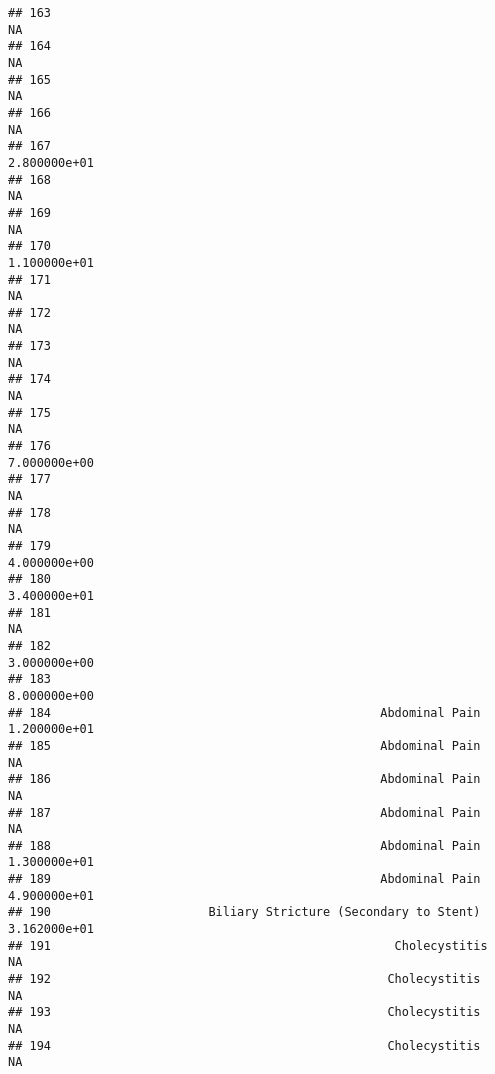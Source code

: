 \documentclass[
]{article}
\begin{document}
\begin{verbatim}
## 163                                                                         NA
## 164                                                                         NA
## 165                                                                         NA
## 166                                                                         NA
## 167                                                               2.800000e+01
## 168                                                                         NA
## 169                                                                         NA
## 170                                                               1.100000e+01
## 171                                                                         NA
## 172                                                                         NA
## 173                                                                         NA
## 174                                                                         NA
## 175                                                                         NA
## 176                                                               7.000000e+00
## 177                                                                         NA
## 178                                                                         NA
## 179                                                               4.000000e+00
## 180                                                               3.400000e+01
## 181                                                                         NA
## 182                                                               3.000000e+00
## 183                                                               8.000000e+00
## 184                                              Abdominal Pain   1.200000e+01
## 185                                              Abdominal Pain             NA
## 186                                              Abdominal Pain             NA
## 187                                              Abdominal Pain             NA
## 188                                              Abdominal Pain   1.300000e+01
## 189                                              Abdominal Pain   4.900000e+01
## 190                      Biliary Stricture (Secondary to Stent)   3.162000e+01
## 191                                                Cholecystitis            NA
## 192                                               Cholecystitis             NA
## 193                                               Cholecystitis             NA
## 194                                               Cholecystitis             NA

\end{verbatim}
\end{document}
